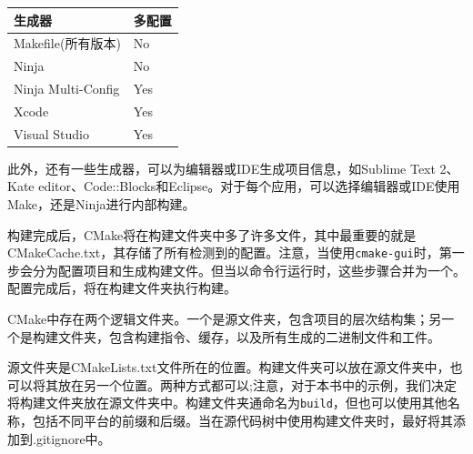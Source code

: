 \begin{table}[H]
	\centering
	\begin{tabular}{|l|l|}
		\hline
		\textbf{生成器}                                                                                                                  &  \textbf{多配置}                                                            \\ \hline
		Makefile(所有版本)                                                                                                                                  &                                                                           No       \\  \hline
		Ninja              &                                                                                  No\\  \hline
		Ninja Multi-Config  &  Yes                                                                                \\ \hline
    Xcode              &                                                                                  Yes\\  \hline
    Visual Studio              &                                                                                  Yes\\  \hline
	\end{tabular}
\end{table}

此外，还有一些生成器，可以为编辑器或IDE生成项目信息，如Sublime Text 2、Kate editor、Code::Blocks和Eclipse。对于每个应用，可以选择编辑器或IDE使用Make，还是Ninja进行内部构建。

构建完成后，CMake将在构建文件夹中多了许多文件，其中最重要的就是CMakeCache.txt，其存储了所有检测到的配置。注意，当使用\texttt{cmake-gui}时，第一步会分为配置项目和生成构建文件。但当以命令行运行时，这些步骤合并为一个。配置完成后，将在构建文件夹执行构建。


CMake中存在两个逻辑文件夹。一个是源文件夹，包含项目的层次结构集；另一个是构建文件夹，包含构建指令、缓存，以及所有生成的二进制文件和工件。

源文件夹是CMakeLists.txt文件所在的位置。构建文件夹可以放在源文件夹中，也可以将其放在另一个位置。两种方式都可以;注意，对于本书中的示例，我们决定将构建文件夹放在源文件夹中。构建文件夹通命名为\texttt{build}，但也可以使用其他名称，包括不同平台的前缀和后缀。当在源代码树中使用构建文件夹时，最好将其添加到.gitignore中。

